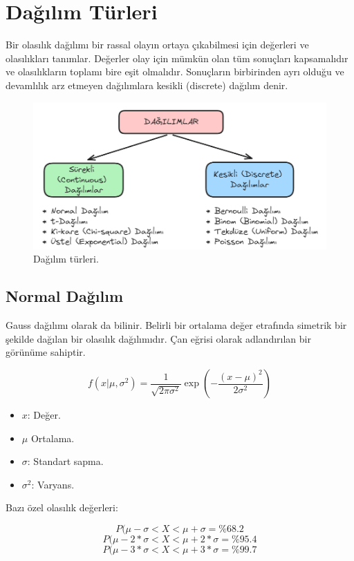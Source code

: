 \section{Dağılım Türleri}
Bir olasılık dağılımı bir rassal olayın ortaya çıkabilmesi için değerleri ve olasılıkları tanımlar. Değerler olay için mümkün olan tüm sonuçları kapsamalıdır ve olasılıkların toplamı bire eşit olmalıdır. Sonuçların birbirinden ayrı olduğu ve devamlılık arz etmeyen dağılımlara kesikli (discrete) dağılım denir. 

\begin{figure}[h]
    \centering
    \includegraphics[width=1\textwidth]{images/types_of_distribution.png}
    \caption{Dağılım türleri.}
    \label{fig:enter-label}
\end{figure}

\newpage

\subsection{Normal Dağılım}
Gauss dağılımı olarak da bilinir. Belirli bir ortalama değer etrafında simetrik bir şekilde dağılan bir olasılık dağılımıdır. Çan eğrisi olarak adlandırılan bir görünüme sahiptir.

\[f(x | \mu, \sigma^2) = \frac{1}{\sqrt{2\pi\sigma^2}} \exp\left(-\frac{(x-\mu)^2}{2\sigma^2}\right)\]
\begin{itemize}
	\item $x$: Değer.
	\item $\mu$ Ortalama.
	\item $\sigma$: Standart sapma.
	\item $\sigma^2$: Varyans.
\end{itemize}

Bazı özel olasılık değerleri:

\[P(\mu - \sigma < X < \mu + \sigma = \%68.2\]
\[P(\mu - 2 * \sigma < X < \mu + 2 * \sigma  = \%95.4\]
\[P(\mu - 3 * \sigma < X < \mu + 3 * \sigma  = \%99.7\]

